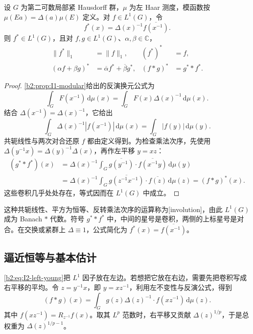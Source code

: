 \begin{proposition}[群代数的对合]
\label{b2:prop:I2-involution}
设 \(G\) 为第二可数局部紧 Hausdorff 群，\(\mu\) 为左 Haar 测度，模函数按 \(\mu(Ea)=\Delta(a)\mu(E)\) 定义。对 \(f\in L^1(G)\)，令
\[
 f^*(x)=\Delta(x)^{-1}\overline{f(x^{-1})}.
\]
则 \(f^*\in L^1(G)\)，且对 \(f,g\in L^1(G)\)、\(\alpha,\beta\in\mathbb C\)，
\[
 \begin{aligned}
 \|f^*\|_1&=\|f\|_1,&(f^*)^*&=f,\\
 (\alpha f+\beta g)^*&=\overline\alpha f^*+\overline\beta g^*,&
 (f*g)^*&=g^**f^*.
 \end{aligned}
\]
\end{proposition}
\begin{proof}
\cref{b2:prop:I1-modular}给出的反演换元公式为
\[
 \int_G F(x^{-1})\,\mathrm d\mu(x)
 =\int_G F(x)\Delta(x)^{-1}\,\mathrm d\mu(x).
\]
结合 \(\Delta(x^{-1})=\Delta(x)^{-1}\)，它给出
\[
 \int_G\Delta(x)^{-1}|f(x^{-1})|\,\mathrm d\mu(x)
 =\int_G|f(y)|\,\mathrm d\mu(y).
\]
共轭线性与两次对合还原 \(f\) 都由定义得到。为检查乘法次序，先使用 \(\Delta(y^{-1}x)=\Delta(y)^{-1}\Delta(x)\)，再作左平移 \(y=xz\)：
\[
 \begin{aligned}
 (g^**f^*)(x)
 &=\Delta(x)^{-1}\int_G
     \overline{g(y^{-1})}\cdot\overline{f(x^{-1}y)}\,\mathrm d\mu(y)\\
 &=\Delta(x)^{-1}\int_G
     \overline{g(z^{-1}x^{-1})}\cdot\overline{f(z)}\,\mathrm d\mu(z)
 =(f*g)^*(x).
 \end{aligned}
\]
这些卷积几乎处处存在，等式因而在 \(L^1(G)\) 中成立。
\end{proof}

这种共轭线性、平方为恒等、反转乘法次序的运算称为[involution]，由此 \(L^1(G)\) 成为 Banach \(*\) 代数。符号 \(g^**f^*\) 中，中间的星号是卷积，两侧的上标星号是对合。在交换或紧群上 \(\Delta\equiv1\)，公式简化为 \(f^*(x)=\overline{f(x^{-1})}\)。

\subsection{逼近恒等与基本估计}
\label{b2:subsec:I20203}

\eqref{b2:eq:I2-left-young}把 \(L^1\) 因子放在左边。若想把它放在右边，需要先把卷积写成右平移的平均。令 \(z=y^{-1}x\)，即 \(y=xz^{-1}\)，利用左不变性与反演公式，得到
\begin{equation}
\label{b2:eq:I2-right-convolution}
 (f*g)(x)=\int_G g(z)\Delta(z)^{-1}\cdot f(xz^{-1})\,\mathrm d\mu(z).
\end{equation}
其中 \(f(xz^{-1})=R_{z^{-1}}f(x)\)。取其 \(L^p\) 范数时，右平移又贡献 \(\Delta(z)^{1/p}\)，于是总权重为 \(\Delta(z)^{1/p-1}\)。

